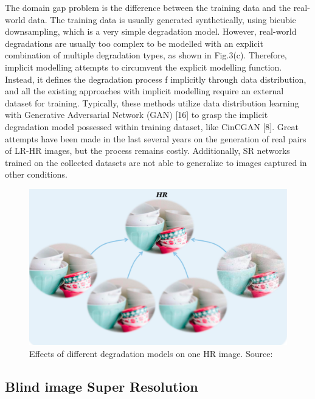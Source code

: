         The domain gap problem is the difference between the training data and the real-world data. The training data is usually generated synthetically, using bicubic downsampling, which is a very simple degradation model. However, real-world degradations are usually too complex to be modelled with an explicit combination of multiple degradation types, as shown in Fig.3(c). Therefore, implicit modelling attempts to circumvent the explicit modelling function. Instead, it defines the degradation process f implicitly through data distribution, and all the existing approaches with implicit modelling require an external dataset for training. Typically, these methods utilize data distribution learning with Generative Adversarial Network (GAN) [16] to grasp the implicit degradation model possessed within training dataset, like CinCGAN [8].
        Great attempts have been made in the last several years on the generation of real pairs of LR-HR images, but the process remains costly.
        Additionally, SR networks trained on the collected datasets are not able to generalize to images captured in other conditions.

        \begin{figure}[h!]
            \centering
            \includegraphics[scale=0.4]{Includes/2-domain-gap.pdf}
            \caption{Effects of different degradation models on one HR image. Source: \cite{liu2021blind}}
            \label{fig:2-domain-gap}
        \end{figure}

            




    \subsection{Blind image Super Resolution}

